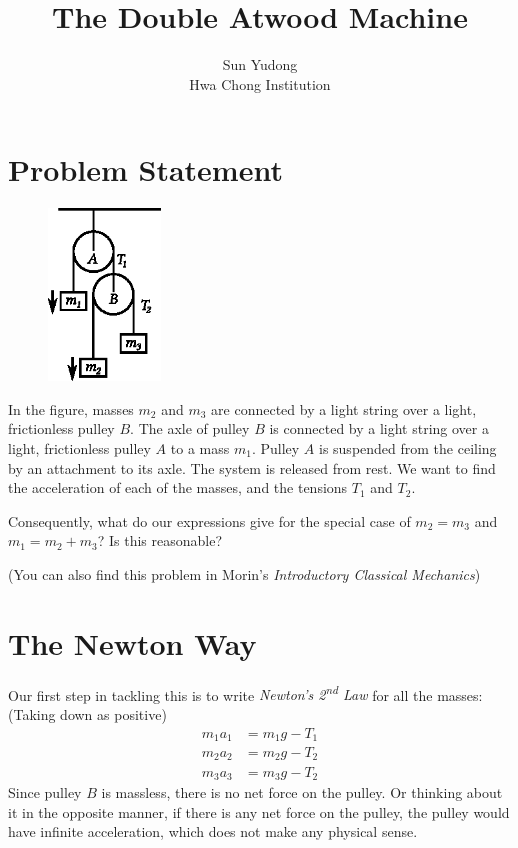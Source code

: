 \documentclass[11pt]{article}
\title{The Double Atwood Machine}
\author{Sun Yudong\\Hwa Chong Institution}
\begin{document}
	\maketitle
	\section*{Problem Statement}
	\begin{figure}
		\centering
		\vspace{-0.7cm}
		\includegraphics[width=3cm]{problem.eps}
		\label{fig:atwood}
	\end{figure}
	In the figure, masses $m_2$ and $m_3$ are connected by a light string over a light, frictionless pulley $B$. The axle of pulley $B$ is connected by a light string over a light, frictionless pulley $A$ to a mass $m_1$. Pulley $A$ is suspended from the ceiling by an attachment to its axle. The system is released from rest. We want to find the acceleration of each of the masses, and the tensions $T_1$ and $T_2$.
	
	Consequently, what do our expressions give for the special case of $m_2 = m_3$ and $m_1 = m_2 + m_3$? Is this reasonable?
	
	(You can also find this problem in Morin's \textit{Introductory Classical Mechanics})
	
	\section*{The Newton Way}
	Our first step in tackling this is to write \textit{Newton's 2\textsuperscript{nd} Law} for all the masses: \\ (Taking down as positive)
	\begin{align}
		m_1 a_1 &= m_1 g - T_1  \label{eqn:m1a1} \\
		m_2 a_2 &= m_2 g - T_2  \label{eqn:m2a2} \\
		m_3 a_3 &= m_3 g - T_2  \label{eqn:m3a3} 
	\end{align}
	Since pulley $B$ is massless, there is no net force on the pulley. Or thinking about it in the opposite manner, if there is any net force on the pulley, the pulley would have infinite acceleration, which does not make any physical sense. 
	
\end{document}
